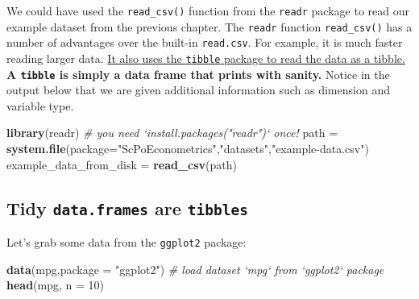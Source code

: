 \documentclass[]{book}
\newenvironment{Shaded}{\begin{snugshade}}{\end{snugshade}}
\newcommand{\KeywordTok}[1]{\textcolor[rgb]{0.13,0.29,0.53}{\textbf{#1}}}
\newcommand{\DataTypeTok}[1]{\textcolor[rgb]{0.13,0.29,0.53}{#1}}
\newcommand{\DecValTok}[1]{\textcolor[rgb]{0.00,0.00,0.81}{#1}}
\newcommand{\StringTok}[1]{\textcolor[rgb]{0.31,0.60,0.02}{#1}}
\newcommand{\CommentTok}[1]{\textcolor[rgb]{0.56,0.35,0.01}{\textit{#1}}}
\newcommand{\NormalTok}[1]{#1}
\begin{document}
We could have used the \texttt{read\_csv()} function from the
\texttt{readr} package to read our example dataset from the previous
chapter. The \texttt{readr} function \texttt{read\_csv()} has a number
of advantages over the built-in \texttt{read.csv}. For example, it is
much faster reading larger data.
\href{https://cran.r-project.org/web/packages/tibble/vignettes/tibble.html}{It
also uses the \texttt{tibble} package to read the data as a tibble.}
\textbf{A \texttt{tibble} is simply a data frame that prints with
sanity.} Notice in the output below that we are given additional
information such as dimension and variable type.

\begin{Shaded}
\begin{Highlighting}[]
\KeywordTok{library}\NormalTok{(readr)  }\CommentTok{# you need `install.packages("readr")` once!}
\NormalTok{path =}\StringTok{ }\KeywordTok{system.file}\NormalTok{(}\DataTypeTok{package=}\StringTok{"ScPoEconometrics"}\NormalTok{,}\StringTok{"datasets"}\NormalTok{,}\StringTok{"example-data.csv"}\NormalTok{)}
\NormalTok{example_data_from_disk =}\StringTok{ }\KeywordTok{read_csv}\NormalTok{(path)}
\end{Highlighting}
\end{Shaded}

\subsection{\texorpdfstring{Tidy \texttt{data.frames} are
\texttt{tibbles}}{Tidy data.frames are tibbles}}\label{tidy-data.frames-are-tibbles}

Let's grab some data from the \texttt{ggplot2} package:

\begin{Shaded}
\begin{Highlighting}[]
\KeywordTok{data}\NormalTok{(mpg,}\DataTypeTok{package =} \StringTok{"ggplot2"}\NormalTok{)  }\CommentTok{# load dataset `mpg` from `ggplot2` package}
\KeywordTok{head}\NormalTok{(mpg, }\DataTypeTok{n =} \DecValTok{10}\NormalTok{)}
\end{Highlighting}
\end{Shaded}
\end{document}
